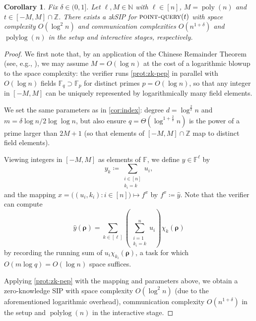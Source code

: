\documentclass[10pt,a4paper]{article}
\newtheorem{corollary}[theorem]{Corollary}
\theoremstyle{definition}
\newcommand{\zksip}{\textrm{zkSIP}}
\newcommand{\N}{\mathbb N}
\newcommand{\Z}{\mathbb Z}
\newcommand{\field}{\mathbb{F}}
\newcommand{\poly}{\operatorname{poly}}
\newcommand{\polylog}{\operatorname{polylog}}
\newcommand{\pointquery}{\normalfont\textsc{point-query}\xspace}
\newcommand{\dimension}{m}
\newcommand{\degree}{d}
\newcommand{\fieldsize}{q}
\newcommand{\fingerprinttuple}{\bm{\rho}}
\begin{document}
\begin{corollary}
    \label{cor:point-query}
    Fix $\delta \in (0,1]$. Let $\ell, M \in \N$ with $\ell \in [n]$, $M = \poly(n)$ and $t \in [-M, M] \cap \Z$. There exists a \zksip{} for $\pointquery(t)$ with space complexity $O(\log^2 n)$ and communication complexities $O(n^{1 + \delta})$ and $\polylog(n)$ in the setup and interactive stages, respectively. 
\end{corollary}
\begin{proof}
    We first note that, by an application of the Chinese Remainder Theorem (see, e.g., \cite{GR15}), we may assume $M = O(\log n)$ at the cost of a logarithmic blowup to the space complexity: the verifier runs \cref{prot:zk-pep} in parallel with $O(\log n)$ fields $\field_\fieldsize \supset \field_p$ for distinct primes $p = O(\log n)$, so that any integer in $[-M, M]$ can be uniquely represented by logarithmically many field elements.
    
    We set the same parameters as in \cref{cor:index}: degree $\degree = \log^{\frac{2}{\delta}} n$ and $\dimension = \delta \log n / 2\log\log n$, but also ensure $\fieldsize = \Theta\left(\log^{1 + \frac{2}{\delta}} n\right)$ is the power of a prime larger than $2M + 1$ (so that elements of $[-M,M] \cap \Z$ map to distinct field elements).
    
    Viewing integers in $[-M,M]$ as elements of $\field$, we define $y \in \field^\ell$ by
    \begin{equation*}
        y_k \coloneqq \sum_{\substack{i \in [n]\\k_i = k}} u_i,
    \end{equation*}
    and the mapping $x = \big((u_i, k_i) : i \in [n]\big) \mapsto f^x$ by $f^x \coloneqq \hat y$. Note that the verifier can compute
    \begin{equation*}
        \hat y(\fingerprinttuple) = \sum_{k \in [\ell]} \left(\sum_{\substack{i = 1\\k_i = k}}^n u_i\right) \chi_k(\fingerprinttuple)
    \end{equation*}
    by recording the running sum of $u_i \chi_{k_i}(\fingerprinttuple)$, a task for which $O(\dimension \log \fieldsize) = O(\log n)$ space suffices.
    
    Applying \cref{prot:zk-pep} with the mapping and parameters above, we obtain a zero-knowledge SIP with space complexity $O(\log^2 n)$ (due to the aforementioned logarithmic overhead), communication complexity $O(n^{1 + \delta})$ in the setup and $\polylog(n)$ in the interactive stage.
\end{proof}
\end{document}
